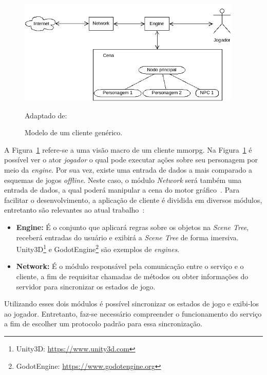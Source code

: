 \begin{figure}[htb!]
\caption{Modelo de um cliente genérico.}
\label{fig:gateway}
\includegraphics[height=5cm]{img/cap2/cliente.png}
\centering

Adaptado de:~\cite{507915, faber}
\end{figure}


A Figura~\ref{fig:gateway} refere-se a uma visão macro de um cliente \ac{mmorpg}.
%
Na Figura~\ref{fig:gateway} é possível ver o ator \textit{jogador} o qual pode executar ações sobre seu personagem por meio da \textit{engine}.
%
Por sua vez, existe uma entrada de dados a mais comparado a esquemas de jogos \textit{offline}.
%
Neste caso, o módulo \textit{Network} será também uma entrada de dados, a qual poderá manipular a cena do motor gráfico~\cite{faber}.
%
Para facilitar o desenvolvimento, a aplicação de cliente é dividida em diversos módulos, entretanto são relevantes ao atual trabalho~\cite{albion_online_unite}:



\begin{itemize}
  \item \textbf{Engine:} É o conjunto que aplicará regras sobre os objetos na \textit{Scene Tree}, receberá entradas do usuário e exibirá a \textit{Scene Tree} de forma imersiva. Unity3D\footnote{Unity3D: \url{https://www.unity3d.com}} e GodotEngine\footnote{GodotEngine: \url{https://www.godotengine.org}} são exemplos de \textit{engines}.
  \item \textbf{Network:} É o módulo responsável pela comunicação entre o serviço e o cliente, a fim de requisitar chamadas de métodos ou obter informações do servidor para sincronizar os estados de jogo.
\end{itemize}



Utilizando esses dois módulos é possível sincronizar os estados de jogo e exibi-los ao jogador.
%
Entretanto, faz-se necessário compreender o funcionamento do serviço a fim de escolher um protocolo padrão para essa sincronização.



